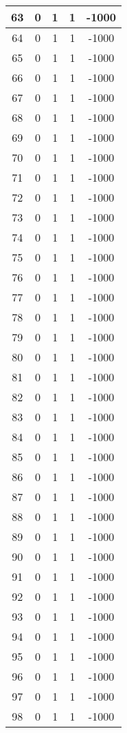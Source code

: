 \documentclass[letterpaper, 12pt]{article}
\begin{document}
\begin{longtable}{|c|c|c|c|c|}
\hline
63 & 0 & 1 & 1 & -1000 \\
\hline
64 & 0 & 1 & 1 & -1000 \\
\hline
65 & 0 & 1 & 1 & -1000 \\
\hline
66 & 0 & 1 & 1 & -1000 \\
\hline
67 & 0 & 1 & 1 & -1000 \\
\hline
68 & 0 & 1 & 1 & -1000 \\
\hline
69 & 0 & 1 & 1 & -1000 \\
\hline
70 & 0 & 1 & 1 & -1000 \\
\hline
71 & 0 & 1 & 1 & -1000 \\
\hline
72 & 0 & 1 & 1 & -1000 \\
\hline
73 & 0 & 1 & 1 & -1000 \\
\hline
74 & 0 & 1 & 1 & -1000 \\
\hline
75 & 0 & 1 & 1 & -1000 \\
\hline
76 & 0 & 1 & 1 & -1000 \\
\hline
77 & 0 & 1 & 1 & -1000 \\
\hline
78 & 0 & 1 & 1 & -1000 \\
\hline
79 & 0 & 1 & 1 & -1000 \\
\hline
80 & 0 & 1 & 1 & -1000 \\
\hline
81 & 0 & 1 & 1 & -1000 \\
\hline
82 & 0 & 1 & 1 & -1000 \\
\hline
83 & 0 & 1 & 1 & -1000 \\
\hline
84 & 0 & 1 & 1 & -1000 \\
\hline
85 & 0 & 1 & 1 & -1000 \\
\hline
86 & 0 & 1 & 1 & -1000 \\
\hline
87 & 0 & 1 & 1 & -1000 \\
\hline
88 & 0 & 1 & 1 & -1000 \\
\hline
89 & 0 & 1 & 1 & -1000 \\
\hline
90 & 0 & 1 & 1 & -1000 \\
\hline
91 & 0 & 1 & 1 & -1000 \\
\hline
92 & 0 & 1 & 1 & -1000 \\
\hline
93 & 0 & 1 & 1 & -1000 \\
\hline
94 & 0 & 1 & 1 & -1000 \\
\hline
95 & 0 & 1 & 1 & -1000 \\
\hline
96 & 0 & 1 & 1 & -1000 \\
\hline
97 & 0 & 1 & 1 & -1000 \\
\hline
98 & 0 & 1 & 1 & -1000 \\

\end{longtable}
\end{document}
